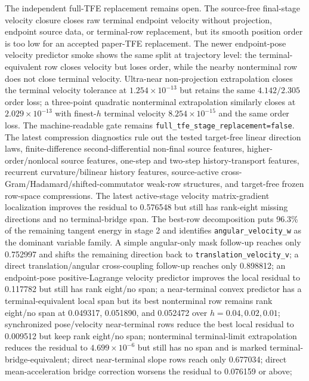 \documentclass[11pt]{article}
\newcommand{\tfe}{TFE}
\begin{document}
The independent full-\tfe{} replacement remains open.  The source-free
final-stage velocity closure closes raw terminal endpoint velocity without
projection, endpoint source data, or terminal-row replacement, but its smooth
position order is too low for an accepted paper-\tfe{} replacement.  The newer
endpoint-pose velocity predictor smoke shows the same split at trajectory
level: the terminal-equivalent row closes velocity but loses order, while the
nearby nonterminal row does not close terminal velocity.  Ultra-near
non-projection extrapolation closes the terminal velocity tolerance at
$1.254\times10^{-13}$ but retains the same $4.142/2.305$ order loss; a
three-point quadratic nonterminal extrapolation similarly closes at
$2.029\times10^{-13}$ with finest-$h$ terminal velocity $8.254\times10^{-15}$
and the same order loss.  The
machine-readable
gate remains \nolinkurl{full_tfe_stage_replacement=false}.  The latest
compression
diagnostics rule out the tested target-free linear direction laws,
finite-difference second-differential non-final source features,
higher-order/nonlocal source features, one-step and two-step history-transport
features, recurrent curvature/bilinear history features,
source-active cross-Gram/Hadamard/shifted-commutator weak-row structures, and
target-free frozen row-space compressions.  The latest active-stage velocity
matrix-gradient localization improves the residual to 0.576548 but still has
rank-eight missing directions and no terminal-bridge span.  The best-row
decomposition puts 96.3\% of the remaining tangent energy in stage 2 and
identifies \nolinkurl{angular_velocity_w} as the dominant variable family.  A
simple angular-only mask follow-up reaches only 0.752997 and shifts the
remaining direction back to \nolinkurl{translation_velocity_v}; a direct
translation/angular cross-coupling follow-up reaches only 0.898812; an
endpoint-pose positive-Lagrange velocity predictor improves the local residual
to 0.117782 but still has rank eight/no span; a near-terminal convex predictor
has a terminal-equivalent local span but its best nonterminal row remains
rank eight/no span at 0.049317, 0.051890, and 0.052472 over
$h=0.04,0.02,0.01$; synchronized pose/velocity near-terminal rows reduce the
best local residual to 0.009512 but keep rank eight/no span; nonterminal
terminal-limit extrapolation reduces the residual to $4.699\times10^{-6}$ but
still has no span and is marked terminal-bridge-equivalent; direct
near-terminal slope rows reach only 0.677034; direct mean-acceleration bridge
correction worsens the residual to 0.076159 or above;
\end{document}
